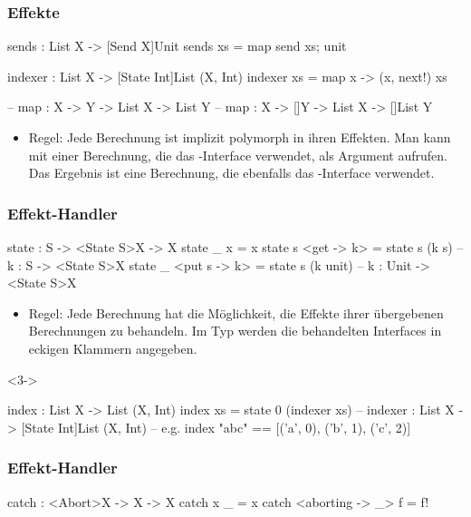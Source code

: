 \documentclass{beamer}
\begin{document}
\begin{frame}[fragile]
  \frametitle{Effekte}

\begin{frankcode}
sends : List X -> [Send X]Unit
sends xs = map send xs; unit

indexer : List X -> [State Int]List (X, Int)
indexer xs = map {x -> (x, next!)} xs

-- map : {X ->   Y} -> List X ->   List Y
-- map : {X -> []Y} -> List X -> []List Y
\end{frankcode}

\begin{itemize}
  \item<2->
    Regel: Jede Berechnung ist implizit polymorph in ihren Effekten.
    Man kann  mit einer Berechnung, die das -Interface verwendet, als Argument aufrufen.
    Das Ergebnis ist eine Berechnung, die ebenfalls das -Interface verwendet.
\end{itemize}
\end{frame}

\begin{frame}[fragile]
  \frametitle{Effekt-Handler}

\begin{frankcode}
state : S -> <State S>X -> X
state _ x            = x
state s <get -> k>   = state s (k s)
  -- k : S -> <State S>X
state _ <put s -> k> = state s (k unit)
  -- k : Unit -> <State S>X
\end{frankcode}

\begin{itemize}
  \item<2->
    Regel: Jede Berechnung hat die Möglichkeit, die Effekte ihrer übergebenen Berechnungen zu behandeln.
    Im Typ werden die behandelten Interfaces in eckigen Klammern angegeben.
\end{itemize}

\begin{visibleenv}<3->
\begin{frankcode}
index : List X -> List (X, Int)
index xs = state 0 (indexer xs)
  -- indexer : List X -> [State Int]List (X, Int)
  -- e.g. index "abc" == [('a', 0), ('b', 1), ('c', 2)]
\end{frankcode}
\end{visibleenv}

\end{frame}

\begin{frame}[fragile]
  \frametitle{Effekt-Handler}

\begin{frankcode}
catch : <Abort>X -> {X} -> X
catch x               _ = x
catch <aborting -> _> f = f!
\end{frankcode}

\end{frame}
\end{document}
